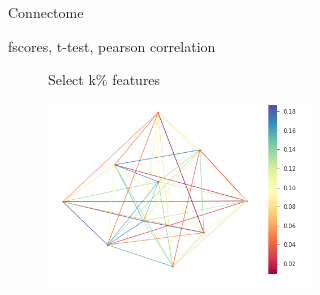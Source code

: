 \documentclass[msthesis.tex]{subfiles}
\begin{document}
\begin{figure}
\begin{subfigure}[b]{0.4\textwidth}
         \caption{Connectome}
         \label{fig:connectivity_matrix}
        \end{subfigure}
    \vfill
        \begin{subfigure}[b]{0.6\textwidth}
         \centering
         \vspace{2em}
        \begin{tcolorbox}[box align= center,coltitle=black!75!black, colback=yellow!5!white,colframe=yellow!50!black,
  colbacktitle=yellow!80!black,title=\centering \large Feature Representation]
        \centering
        fscores, t-test, pearson correlation
        \end{tcolorbox}
        \caption{}
         \label{fig:feature extraction}
         \end{subfigure}
    \vfill
    \begin{subfigure}[b]{0.9\textwidth}
    \begin{subfigure}[b]{0.3\textwidth}
        \begin{tcolorbox}[coltitle=black!60!black ,colback=yellow!5!white,colframe=yellow!50!black,
  colbacktitle=yellow!75!black, fontupper=\color{black}, title=\centering \large Feature Selection]
        Select k\% features
        \end{tcolorbox}
         \vspace{+1.5cm}
         \label{fig:feature selection}
         \end{subfigure}
    \hfill
    \begin{subfigure}[b]{0.4\textwidth}
         \centering
         \includegraphics[height =0.8\textwidth,width=\textwidth]{images/mews.png}

\end{subfigure}
\end{subfigure}
\end{figure}
\end{document}

